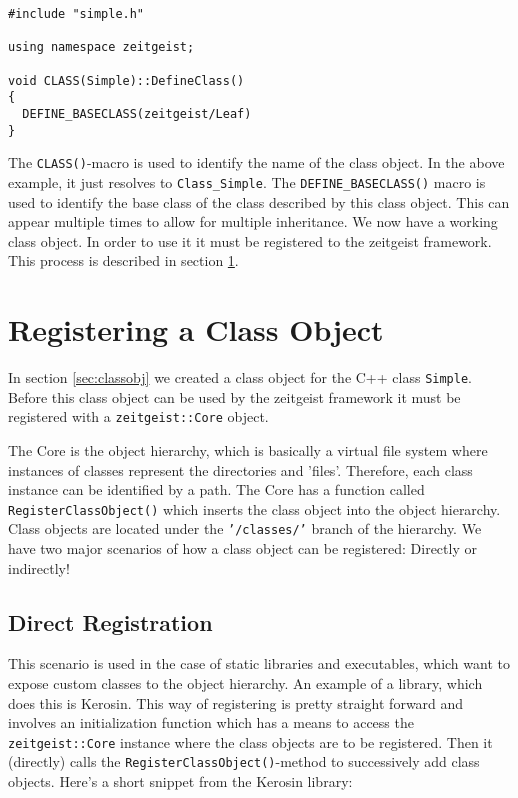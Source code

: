 \begin{verbatim}
#include "simple.h"

using namespace zeitgeist;

void CLASS(Simple)::DefineClass()
{
  DEFINE_BASECLASS(zeitgeist/Leaf)
}
\end{verbatim}


The \texttt{CLASS()}-macro is used to identify the name of the class
object. In the above example, it just resolves to
\texttt{Class\_Simple}. The \texttt{DEFINE\_BASECLASS()} macro is used to 
identify the base class of the class described by this class
object. This can appear multiple times to allow for multiple
inheritance. We now have a working class object. In order to use it it
must be registered to the zeitgeist framework. This process is
described in section \ref{sec:regobj}.

\section{Registering a Class Object}
\label{sec:regobj}

In section \ref{sec:classobj} we created a class object for the C++
class \texttt{Simple}. Before this class object can be used by the
zeitgeist framework it must be registered with a
\texttt{zeitgeist::Core} object. 

The Core is the object hierarchy, which is basically a virtual file
system where instances of classes represent the directories and
'files'. Therefore, each class instance can be identified by a
path. The Core has a function called \texttt{RegisterClassObject()}
which inserts the class object into the object hierarchy. Class
objects are located under the \texttt{'/classes/'} branch of the
hierarchy. We have two major scenarios of how a class object can be
registered: Directly or indirectly!

\subsection{Direct Registration}

This scenario is used in the case of static libraries and executables,
which want to expose custom classes to the object hierarchy. An
example of a library, which does this is Kerosin. This way of
registering is pretty straight forward and involves an initialization
function which has a means to access the \texttt{zeitgeist::Core}
instance where the class objects are to be registered. Then it
(directly) calls the \texttt{RegisterClassObject()}-method to
successively add class objects. Here's a short snippet from the
Kerosin library:

